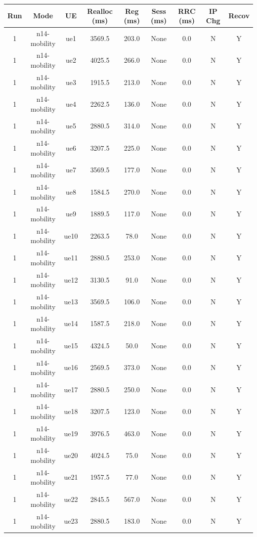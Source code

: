 \begin{table}[ht]
\centering
\begin{tabular}{|c|c|c|c|c|c|c|c|c|}
\hline
Run & Mode & UE & Realloc (ms) & Reg (ms) & Sess (ms) & RRC (ms) & IP Chg & Recov \\
\hline
1 & n14-mobility & ue1 & 3569.5 & 203.0 & None & 0.0 & N & Y \\
1 & n14-mobility & ue2 & 4025.5 & 266.0 & None & 0.0 & N & Y \\
1 & n14-mobility & ue3 & 1915.5 & 213.0 & None & 0.0 & N & Y \\
1 & n14-mobility & ue4 & 2262.5 & 136.0 & None & 0.0 & N & Y \\
1 & n14-mobility & ue5 & 2880.5 & 314.0 & None & 0.0 & N & Y \\
1 & n14-mobility & ue6 & 3207.5 & 225.0 & None & 0.0 & N & Y \\
1 & n14-mobility & ue7 & 3569.5 & 177.0 & None & 0.0 & N & Y \\
1 & n14-mobility & ue8 & 1584.5 & 270.0 & None & 0.0 & N & Y \\
1 & n14-mobility & ue9 & 1889.5 & 117.0 & None & 0.0 & N & Y \\
1 & n14-mobility & ue10 & 2263.5 & 78.0 & None & 0.0 & N & Y \\
1 & n14-mobility & ue11 & 2880.5 & 253.0 & None & 0.0 & N & Y \\
1 & n14-mobility & ue12 & 3130.5 & 91.0 & None & 0.0 & N & Y \\
1 & n14-mobility & ue13 & 3569.5 & 106.0 & None & 0.0 & N & Y \\
1 & n14-mobility & ue14 & 1587.5 & 218.0 & None & 0.0 & N & Y \\
1 & n14-mobility & ue15 & 4324.5 & 50.0 & None & 0.0 & N & Y \\
1 & n14-mobility & ue16 & 2569.5 & 373.0 & None & 0.0 & N & Y \\
1 & n14-mobility & ue17 & 2880.5 & 250.0 & None & 0.0 & N & Y \\
1 & n14-mobility & ue18 & 3207.5 & 123.0 & None & 0.0 & N & Y \\
1 & n14-mobility & ue19 & 3976.5 & 463.0 & None & 0.0 & N & Y \\
1 & n14-mobility & ue20 & 4024.5 & 75.0 & None & 0.0 & N & Y \\
1 & n14-mobility & ue21 & 1957.5 & 77.0 & None & 0.0 & N & Y \\
1 & n14-mobility & ue22 & 2845.5 & 567.0 & None & 0.0 & N & Y \\
1 & n14-mobility & ue23 & 2880.5 & 183.0 & None & 0.0 & N & Y \\

\end{tabular}
\end{table}
